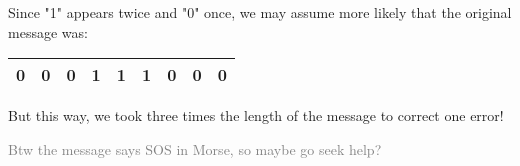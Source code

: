 \begin{frame}
{\begin{center}
    \end{center}
    }
    
    \bigskip
    
    Since "1" appears twice and "0" once, we may assume more likely that the original message was:
    
    \bigskip
    
    \begin{center}
    \begin{tabular}{|c|c|c|c|c|c|c|c|c|}
        \hline
        0 & 0 & 0 & 1 & \cellcolor{green!20} 1 & 1 & 0 & 0 & 0 \\
        \hline
    \end{tabular}
    \end{center}
    
    \bigskip
    
    But this way, we took three times the length of the message to correct one error!
    
    \bigskip
    
    \textcolor{gray}{Btw the message says SOS in Morse, so maybe go seek help?}
    \end{frame}
    
